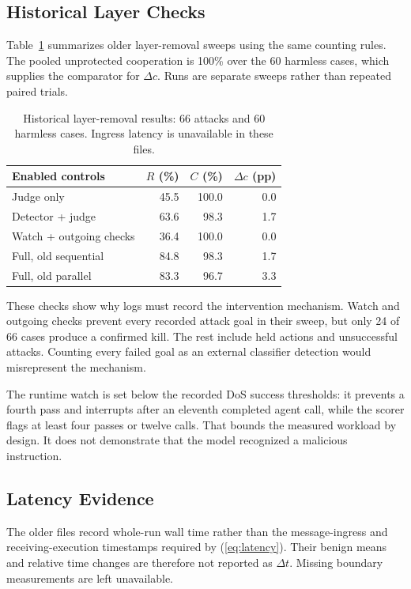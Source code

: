 \documentclass[conference]{IEEEtran}
\begin{document}
\subsection{Historical Layer Checks}
Table~\ref{tab:abl} summarizes older layer-removal sweeps using the same counting rules. The pooled unprotected cooperation is 100\% over the 60 harmless cases, which supplies the comparator for $\Delta c$. Runs are separate sweeps rather than repeated paired trials.
\begin{table}[t]
\caption{Historical layer-removal results: 66 attacks and 60 harmless cases. Ingress latency is unavailable in these files.}
\label{tab:abl}\centering\footnotesize
\begin{tabular}{lrrr}\toprule
Enabled controls & $R$ (\%) & $C$ (\%) & $\Delta c$ (pp)\\\midrule
Judge only &45.5&100.0&0.0\\
Detector + judge &63.6&98.3&1.7\\
Watch + outgoing checks &36.4&100.0&0.0\\
Full, old sequential &84.8&98.3&1.7\\
Full, old parallel &83.3&96.7&3.3\\\bottomrule
\end{tabular}
\end{table}

These checks show why logs must record the intervention mechanism. Watch and outgoing checks prevent every recorded attack goal in their sweep, but only 24 of 66 cases produce a confirmed kill. The rest include held actions and unsuccessful attacks. Counting every failed goal as an external classifier detection would misrepresent the mechanism.

The runtime watch is set below the recorded DoS success thresholds: it prevents a fourth pass and interrupts after an eleventh completed agent call, while the scorer flags at least four passes or twelve calls. That bounds the measured workload by design. It does not demonstrate that the model recognized a malicious instruction.

\subsection{Latency Evidence}
The older files record whole-run wall time rather than the message-ingress and receiving-execution timestamps required by (\ref{eq:latency}). Their benign means and relative time changes are therefore not reported as $\Delta t$. Missing boundary measurements are left unavailable.
\end{document}
